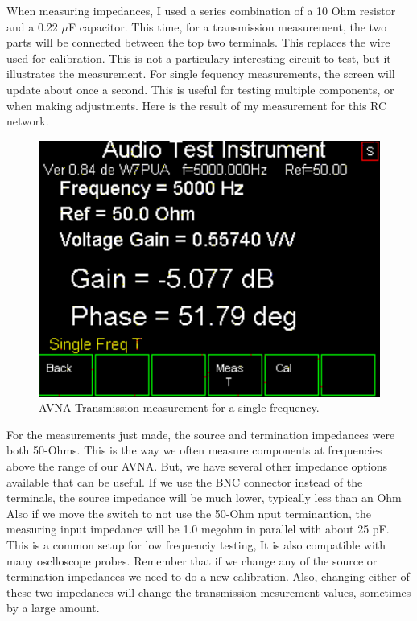 %
When measuring impedances, I used a series combination of a 10 Ohm resistor and a 0.22 $\mu$F capacitor.  This time, for a transmission measurement, the two parts will be connected between the top two terminals. This replaces the wire used for calibration.  This is not a particulary interesting circuit to test, but it illustrates the measurement.  For single fequency measurements, the screen will update about once a second.  This is useful for testing multiple components, or when making adjustments.  Here is the result of my measurement for this RC network.
\begin{figure}[H]
\begin{center}
\includegraphics[scale=0.75]{./images/AVNA_047.pdf}
\caption{AVNA Transmission measurement for a single frequency.}
\label{AVNA_047-label}
\end{center}
\end{figure}
%
For the measurements  just made, the source and termination impedances were both 50-Ohms.  This is the way we often measure components at frequencies above the range of our AVNA.  But, we have several other impedance options available that can be useful.  If we use the BNC connector instead of the terminals, the source impedance will be much lower, typically less than an Ohm  Also if we move the switch to not use the 50-Ohm nput terminantion, the measuring input impedance will be 1.0 megohm in parallel with about 25 pF.  This is a common setup for low frequenciy testing,  It is also compatible with many osclloscope probes.  Remember that if we change any of the source or termination impedances we need to do a new calibration.  Also, changing either of these two impedances will change the transmission mesurement values, sometimes by a large amount.


